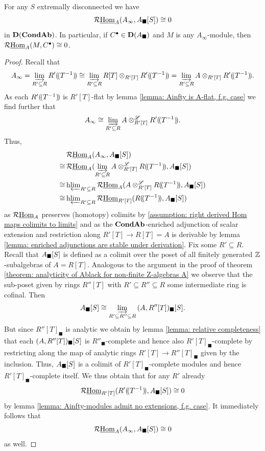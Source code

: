 \begin{lemma}
	\label{lemma: Ainfty-modules admit not extensions by Ablack-completes}
	
	For any $S$ extremally disconnected we have
		$$\mathcal{R}{\underline{\operatorname{Hom}}}_A(A_\infty, {A_\blacksquare[S]}) \cong 0$$
	in ${{\mathbf{D}}({{{\mathbf{Cond}}}{{\mathbf{Ab}}}})}$. In particular, if $C^\bullet \in {{\mathbf{D}}(A_\blacksquare)}$ and $M$ is any $A_\infty$-module, then $\mathcal{R}{\underline{\operatorname{Hom}}}_A(M, C^\bullet)\cong 0$.
\end{lemma}
\begin{proof}
	Recall that
	$$A_\infty = \varinjlim_{R'\subseteq R} {R'(\!(T^{-1})\!)}\cong \varinjlim_{R'\subseteq R} R[T] \otimes_{R'[T]} {R'(\!(T^{-1})\!)} = \varinjlim_{R'\subseteq R} A \otimes_{R'[T]} {R'(\!(T^{-1})\!)}.$$
	As each ${R'(\!(T^{-1})\!)}$ is $R'[T]$-flat by lemma \ref{lemma: Ainfty is A-flat, f.g. case} we find further that
		$$A_\infty \cong \varinjlim_{R'\subseteq R} A\otimes^{\mathscr{L}}_{R'[T]} {R'(\!(T^{-1})\!)}.$$
	Thus,
	\begin{align*}
		&\, \eRHom_A(A_\infty, \free{A_\blacksquare}{S})\\
		\cong &\, \eRHom_A(\colimit_{R'\subseteq R} A\Dotimes_{R'[T]} \laurent{R}{T^{-1}}, \free{A_\blacksquare}{S})\\
		\cong &\, \homotopyLimit_{R'\subseteq R} \eRHom_A(A\Dotimes_{R'[T]} \laurent{R}{T^{-1}}, \free{A_\blacksquare}{S})\\
		\cong &\, \homotopyLimit_{R'\subseteq R} \eRHom_{R'[T]}(\laurent{R}{T^{-1}}, \free{A_\blacksquare}{S})\\
	\end{align*}
	as $\mathcal{R}{\underline{\operatorname{Hom}}}_A$ preserves (homotopy) colimits by \assumptionPreWord \ref{assumption: right derived Hom maps colimits to limits} and as the ${{{\mathbf{Cond}}}{{\mathbf{Ab}}}}$-enriched adjunction of scalar extension and restriction along $R'[T]\to R[T]=A$ is derivable by lemma \ref{lemma: enriched adjunctions are stable under derivation}. Fix some $R'\subseteq R$. Recall that ${A_\blacksquare[S]}$ is defined as a colimit over the poset of all finitely generated ${\mathbb{Z}}$-subalgebras of $A=R[T]$. Analogous to the argument in the proof of theorem \ref{theorem: analyticity of Ablack for non-finite Z-algebras A} we observe that the sub-poset given by rings $R''[T]$ with $R'\subseteq R''\subseteq R$ some intermediate ring is cofinal. Then
	$${A_\blacksquare[S]} \cong \varinjlim_{R'\subseteq R''\subseteq R} {(A, R''[T])_\blacksquare[S]}.$$
	But since $R''[T]_\blacksquare$ is analytic we obtain by lemma \ref{lemma: relative completeness} that each ${(A, R''[T])_\blacksquare[S]}$ is $R''_\blacksquare$-complete and hence also $R'[T]_\blacksquare$-complete by restricting along the map of analytic rings $R'[T]\to R''[T]_\blacksquare$ given by the inclusion. Thus, ${A_\blacksquare[S]}$ is a colimit of $R'[T]_\blacksquare$-complete modules and hence $R'[T]_\blacksquare$-complete itself. We thus obtain that for any $R'$ already
	$$\mathcal{R}{\underline{\operatorname{Hom}}}_{R'[T]}({R'(\!(T^{-1})\!)}, {A_\blacksquare[S]}) \cong 0$$
	by lemma \ref{lemma: Ainfty-modules admit no extensions, f.g. case}. It immediately follows that
	$$\mathcal{R}{\underline{\operatorname{Hom}}}_A(A_\infty, {A_\blacksquare[S]}) \cong 0$$
	as well.
	

\end{proof}
